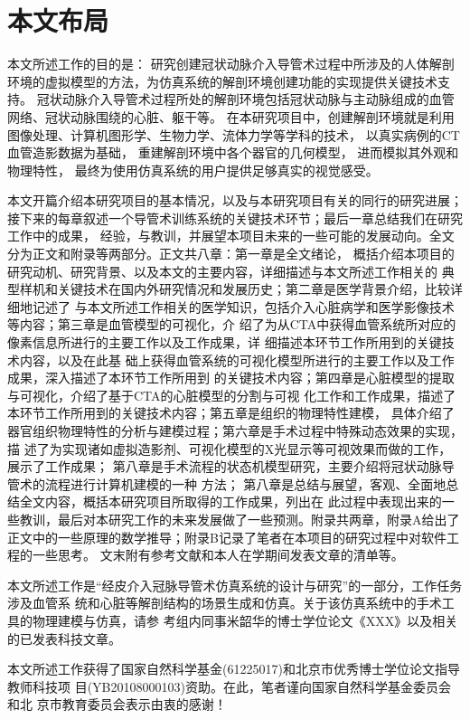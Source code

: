 \section{本文布局}
\label{sec1-5}

本文所述工作的目的是：
研究创建冠状动脉介入导管术过程中所涉及的人体解剖环境的虚拟模型的方法，为仿真系统的解剖环境创建功能的实现提供关键技术支持。
冠状动脉介入导管术过程所处的解剖环境包括冠状动脉与主动脉组成的血管网络、冠状动脉围绕的心脏、躯干等。
在本研究项目中，创建解剖环境就是利用图像处理、计算机图形学、生物力学、流体力学等学科的技术，
以真实病例的CT血管造影数据为基础，
重建解剖环境中各个器官的几何模型，
进而模拟其外观和物理特性，
最终为使用仿真系统的用户提供足够真实的视觉感受。

本文开篇介绍本研究项目的基本情况，以及与本研究项目有关的同行的研究进展；
接下来的每章叙述一个导管术训练系统的关键技术环节；最后一章总结我们在研究工作中的成果，
经验，与教训，并展望本项目未来的一些可能的发展动向。全文分为正文和附录等两部分。正文共八章：第一章是全文绪论，
概括介绍本项目的研究动机、研究背景、以及本文的主要内容，详细描述与本文所述工作相关的
典型样机和关键技术在国内外研究情况和发展历史；第二章是医学背景介绍，比较详细地记述了
与本文所述工作相关的医学知识，包括介入心脏病学和医学影像技术等内容；第三章是血管模型的可视化，介
绍了为从CTA中获得血管系统所对应的像素信息所进行的主要工作以及工作成果，详
细描述本环节工作所用到的关键技术内容，以及在此基
础上获得血管系统的可视化模型所进行的主要工作以及工作成果，深入描述了本环节工作所用到
的关键技术内容；第四章是心脏模型的提取与可视化，介绍了基于CTA的心脏模型的分割与可视
化工作和工作成果，描述了本环节工作所用到的关键技术内容；第五章是组织的物理特性建模，
具体介绍了器官组织物理特性的分析与建模过程；第六章是手术过程中特殊动态效果的实现，描
述了为实现诸如虚拟造影剂、可视化模型的X光显示等可视效果而做的工作，展示了工作成果；
第八章是手术流程的状态机模型研究，主要介绍将冠状动脉导管术的流程进行计算机建模的一种
方法；
第八章是总结与展望，客观、全面地总结全文内容，概括本研究项目所取得的工作成果，列出在
此过程中表现出来的一些教训，最后对本研究工作的未来发展做了一些预测。附录共两章，附录A给出了正文中的一些原理的数学推导；附录B记录了笔者在本项目的研究过程中对软件工程的一些思考。
文末附有参考文献和本人在学期间发表文章的清单等。

本文所述工作是“经皮介入冠脉导管术仿真系统的设计与研究”的一部分，工作任务涉及血管系
统和心脏等解剖结构的场景生成和仿真。关于该仿真系统中的手术工具的物理建模与仿真，请参
考组内同事米韶华的博士学位论文《XXX》以及相关的已发表科技文章。

本文所述工作获得了国家自然科学基金(61225017)和北京市优秀博士学位论文指导教师科技项
目(YB20108000103)资助。在此，笔者谨向国家自然科学基金委员会和北
京市教育委员会表示由衷的感谢！ 